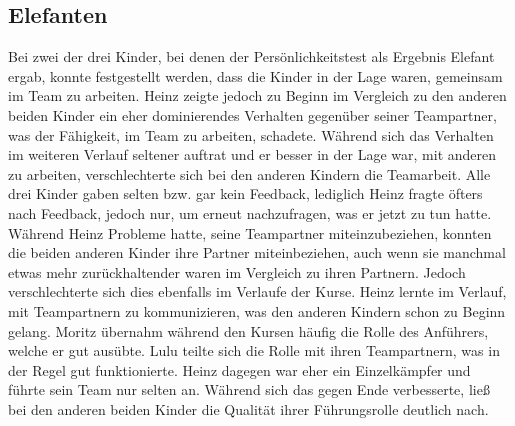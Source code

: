 \subsection*{Elefanten}
Bei zwei der drei Kinder, bei denen der Persönlichkeitstest als Ergebnis Elefant ergab, konnte festgestellt werden, dass die Kinder in der Lage waren, gemeinsam im Team zu arbeiten. Heinz zeigte jedoch zu Beginn im Vergleich zu den anderen beiden Kinder ein eher dominierendes Verhalten gegenüber seiner Teampartner, was der Fähigkeit, im Team zu arbeiten, schadete. Während sich das Verhalten im weiteren Verlauf seltener auftrat und er besser in der Lage war, mit anderen zu arbeiten, verschlechterte sich bei den anderen Kindern die Teamarbeit. Alle drei Kinder gaben selten bzw. gar kein Feedback, lediglich Heinz fragte öfters nach Feedback, jedoch nur, um erneut nachzufragen, was er jetzt zu tun hatte. Während Heinz Probleme hatte, seine Teampartner miteinzubeziehen, konnten die beiden anderen Kinder ihre Partner miteinbeziehen, auch wenn sie manchmal etwas mehr zurückhaltender waren im Vergleich zu ihren Partnern. Jedoch verschlechterte sich dies ebenfalls im Verlaufe der Kurse. Heinz lernte im Verlauf, mit Teampartnern zu kommunizieren, was den anderen Kindern schon zu Beginn gelang. Moritz übernahm während den Kursen häufig die Rolle des Anführers, welche er gut ausübte. Lulu teilte sich die Rolle mit ihren Teampartnern, was in der Regel gut funktionierte. Heinz dagegen war eher ein Einzelkämpfer und führte sein Team nur selten an. Während sich das gegen Ende verbesserte, ließ bei den anderen beiden Kinder die Qualität ihrer Führungsrolle deutlich nach.

